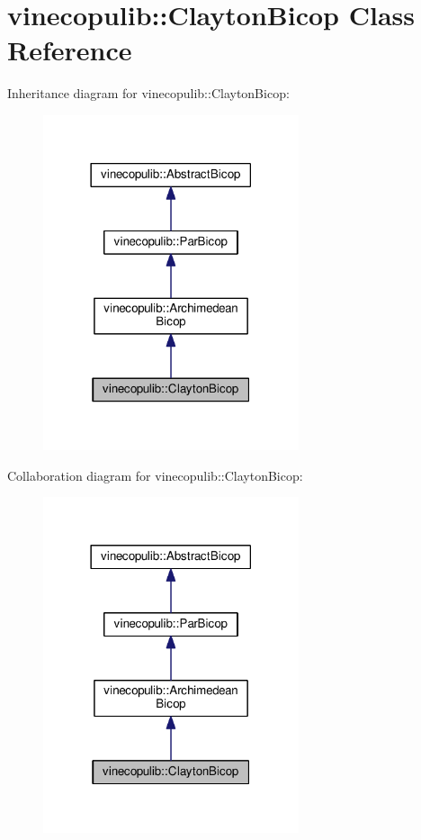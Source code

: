 \hypertarget{classvinecopulib_1_1_clayton_bicop}{}\section{vinecopulib\+:\+:Clayton\+Bicop Class Reference}
\label{classvinecopulib_1_1_clayton_bicop}


Inheritance diagram for vinecopulib\+:\+:Clayton\+Bicop\+:\nopagebreak
\begin{figure}[H]
\begin{center}
\leavevmode
\includegraphics[width=213pt]{classvinecopulib_1_1_clayton_bicop__inherit__graph}
\end{center}
\end{figure}


Collaboration diagram for vinecopulib\+:\+:Clayton\+Bicop\+:\nopagebreak
\begin{figure}[H]
\begin{center}
\leavevmode
\includegraphics[width=213pt]{classvinecopulib_1_1_clayton_bicop__coll__graph}
\end{center}
\end{figure}

